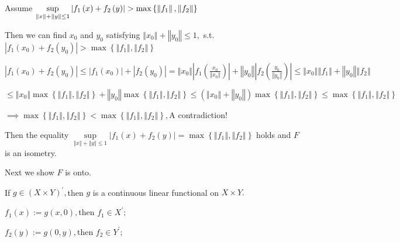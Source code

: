 \documentclass{article}
\begin{document}
Assume $\underset{\left\Vert x\right\Vert +\left\Vert y\right\Vert \leq 1}{%
\sup }\left\vert f_{1}\left( x\right) +f_{2}\left( y\right) \right\vert
>\max \left\{ \left\Vert f_{1}\right\Vert ,\left\Vert f_{2}\right\Vert
\right\} $

Then we can find $x_{0}$ and $y_{0}$ satisfying $\left\Vert x_{0}\right\Vert
+\left\Vert y_{0}\right\Vert \leq 1,$ s.t. $\left\vert f_{1}\left(
x_{0}\right) +f_{2}\left( y_{0}\right) \right\vert >\max \left\{ \left\Vert
f_{1}\right\Vert ,\left\Vert f_{2}\right\Vert \right\} $

$\left\vert f_{1}\left( x_{0}\right) +f_{2}\left( y_{0}\right) \right\vert
\leq \left\vert f_{1}\left( x_{0}\right) \right\vert +\left\vert f_{2}\left(
y_{0}\right) \right\vert =\left\Vert x_{0}\right\Vert \left\vert f_{1}\left( 
\frac{x_{0}}{\left\Vert x_{0}\right\Vert }\right) \right\vert +\left\Vert
y_{0}\right\Vert \left\vert f_{2}\left( \frac{y_{0}}{\left\Vert
y_{0}\right\Vert }\right) \right\vert \leq \left\Vert x_{0}\right\Vert
\left\Vert f_{1}\right\Vert +\left\Vert y_{0}\right\Vert \left\Vert
f_{2}\right\Vert $

$\leq \left\Vert x_{0}\right\Vert \max \left\{ \left\Vert f_{1}\right\Vert
,\left\Vert f_{2}\right\Vert \right\} +\left\Vert y_{0}\right\Vert \max
\left\{ \left\Vert f_{1}\right\Vert ,\left\Vert f_{2}\right\Vert \right\}
\leq \left( \left\Vert x_{0}\right\Vert +\left\Vert y_{0}\right\Vert \right)
\max \left\{ \left\Vert f_{1}\right\Vert ,\left\Vert f_{2}\right\Vert
\right\} \leq \max \left\{ \left\Vert f_{1}\right\Vert ,\left\Vert
f_{2}\right\Vert \right\} $

$\implies \max \left\{ \left\Vert f_{1}\right\Vert ,\left\Vert
f_{2}\right\Vert \right\} <\max \left\{ \left\Vert f_{1}\right\Vert
,\left\Vert f_{2}\right\Vert \right\} ,$A contradiction!

Then the equality $\underset{\left\Vert x\right\Vert +\left\Vert
y\right\Vert \leq 1}{\sup }\left\vert f_{1}\left( x\right) +f_{2}\left(
y\right) \right\vert =\max \left\{ \left\Vert f_{1}\right\Vert ,\left\Vert
f_{2}\right\Vert \right\} $ holds and $F$ is an isometry.

Next we show $F$ is onto.

If $g\in \left( X\times Y\right) ^{\prime },$then $g$ is a continuous linear
functional on $X\times Y.$

$f_{1}\left( x\right) :=g(x,0),$then $f_{1}\in X^{\prime };$

$f_{2}\left( y\right) :=g(0,y),$then $f_{2}\in Y^{\prime };$
\end{document}

